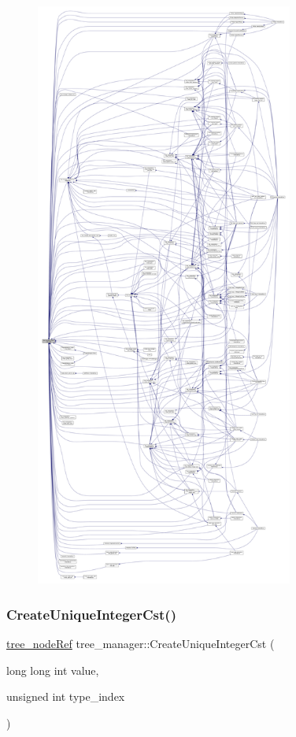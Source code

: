 \begin{figure}[H]
\begin{center}
\leavevmode
\includegraphics[height=550pt]{d2/ddd/classtree__manager_a6a73965fdf587f77158f5dc384e037a1_icgraph}
\end{center}
\end{figure}
\mbox{\label{classtree__manager_a45e4ad0e5ed7a544fb1527ba11bc9fb2}} 
\subsubsection{\texorpdfstring{Create\+Unique\+Integer\+Cst()}{CreateUniqueIntegerCst()}}
{\footnotesize\ttfamily \hyperlink{tree__node_8hpp_a6ee377554d1c4871ad66a337eaa67fd5}{tree\+\_\+node\+Ref} tree\+\_\+manager\+::\+Create\+Unique\+Integer\+Cst (\begin{DoxyParamCaption}\item[{long long int}]{value,  }\item[{unsigned int}]{type\+\_\+index }\end{DoxyParamCaption})}



